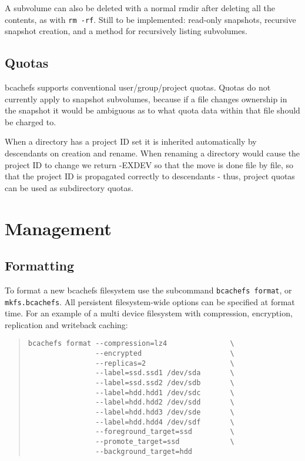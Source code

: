 \documentclass{article}
\begin{document}
A subvolume can also be deleted with a normal rmdir after deleting all the
contents, as with \texttt{rm -rf}. Still to be implemented: read-only snapshots,
recursive snapshot creation, and a method for recursively listing subvolumes.

\subsection{Quotas}

bcachefs supports conventional user/group/project quotas. Quotas do not
currently apply to snapshot subvolumes, because if a file changes ownership in
the snapshot it would be ambiguous as to what quota data within that file
should be charged to.

When a directory has a project ID set it is inherited automatically by
descendants on creation and rename. When renaming a directory would cause the
project ID to change we return -EXDEV so that the move is done file by file, so
that the project ID is propagated correctly to descendants - thus, project
quotas can be used as subdirectory quotas.

\section{Management}

\subsection{Formatting}

To format a new bcachefs filesystem use the subcommand \texttt{bcachefs
format}, or \texttt{mkfs.bcachefs}. All persistent filesystem-wide options can
be specified at format time. For an example of a multi device filesystem with
compression, encryption, replication and writeback caching:
\begin{quote} \begin{verbatim}
bcachefs format --compression=lz4               \
                --encrypted                     \
                --replicas=2                    \
                --label=ssd.ssd1 /dev/sda       \
                --label=ssd.ssd2 /dev/sdb       \
                --label=hdd.hdd1 /dev/sdc       \
                --label=hdd.hdd2 /dev/sdd       \
                --label=hdd.hdd3 /dev/sde       \
                --label=hdd.hdd4 /dev/sdf       \
                --foreground_target=ssd	        \
                --promote_target=ssd            \
                --background_target=hdd
\end{verbatim} \end{quote}
\end{document}
